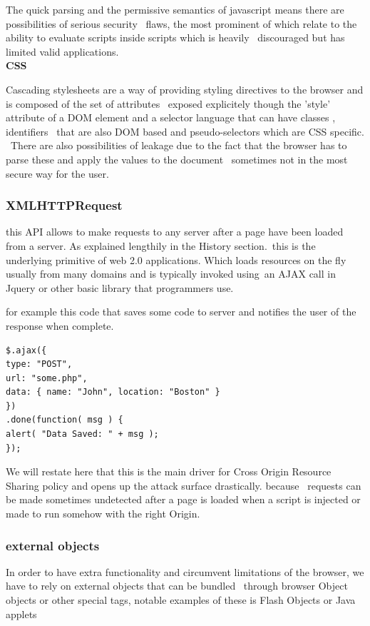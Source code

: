 \documentclass[a4paper,12pt]{paper}
\begin{document}
The quick parsing and the permissive semantics of javascript means there are possibilities of serious security \
flaws, the most prominent of which relate to the ability to evaluate scripts inside scripts which is heavily \
discouraged but has limited valid applications.\\

\textbf{CSS}

Cascading stylesheets are a way of providing styling directives to the browser and is composed of the set of attributes \
exposed explicitely though the 'style' attribute of a DOM element and a selector language that can have classes , identifiers \
that are also DOM based and pseudo-selectors which are CSS specific. \
There are also possibilities of leakage due to the fact that the browser has to parse these and apply the values to the document \
sometimes not in the most secure way for the user.\\

\subsubsection{XMLHTTPRequest}

this API allows to make requests to any server after a page have been loaded from a server. As explained lengthily in the History section.\
this is the underlying primitive of web 2.0 applications. Which loads resources on the fly usually from many domains and is typically invoked using\
an AJAX call in Jquery or other basic library that programmers use.

for example this code that saves some code to server  and notifies the user of the response when complete.
\begin{verbatim}
$.ajax({
type: "POST",
url: "some.php",
data: { name: "John", location: "Boston" }
})
.done(function( msg ) {
alert( "Data Saved: " + msg );
});\end{verbatim}

We will restate here that this is the main driver for Cross Origin Resource Sharing policy and opens up the attack surface drastically. because \
requests can be made sometimes undetected after a page is loaded when a script is injected or made to run somehow with the right Origin.\

\subsubsection{external objects}

In order to have extra functionality and circumvent limitations of the browser, we have to rely on external objects that can be bundled \
through browser Object objects or other special tags, notable examples of these is Flash Objects or Java applets
\end{document}
